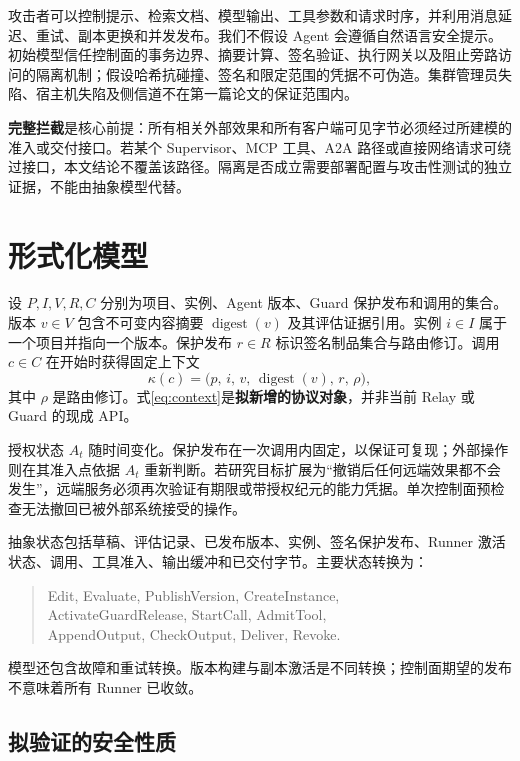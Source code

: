 \documentclass[11pt,a4paper]{article}
\theoremstyle{definition}
\begin{document}
攻击者可以控制提示、检索文档、模型输出、工具参数和请求时序，并利用消息延迟、重试、副本更换和并发发布。我们不假设 Agent 会遵循自然语言安全提示。初始模型信任控制面的事务边界、摘要计算、签名验证、执行网关以及阻止旁路访问的隔离机制；假设哈希抗碰撞、签名和限定范围的凭据不可伪造。集群管理员失陷、宿主机失陷及侧信道不在第一篇论文的保证范围内。

\textbf{完整拦截}是核心前提：所有相关外部效果和所有客户端可见字节必须经过所建模的准入或交付接口。若某个 Supervisor、MCP 工具、A2A 路径或直接网络请求可绕过接口，本文结论不覆盖该路径。隔离是否成立需要部署配置与攻击性测试的独立证据，不能由抽象模型代替。

\section{形式化模型}

设 $P,I,V,R,C$ 分别为项目、实例、Agent 版本、Guard 保护发布和调用的集合。版本 $v\in V$ 包含不可变内容摘要 $\operatorname{digest}(v)$ 及其评估证据引用。实例 $i\in I$ 属于一个项目并指向一个版本。保护发布 $r\in R$ 标识签名制品集合与路由修订。调用 $c\in C$ 在开始时获得固定上下文
\begin{equation}
\kappa(c)=\bigl(p,\,i,\,v,\,\operatorname{digest}(v),\,r,\,\rho\bigr),
\label{eq:context}
\end{equation}
其中 $\rho$ 是路由修订。式\eqref{eq:context}是\textbf{拟新增的协议对象}，并非当前 Relay 或 Guard 的现成 API。

授权状态 $A_t$ 随时间变化。保护发布在一次调用内固定，以保证可复现；外部操作则在其准入点依据 $A_t$ 重新判断。若研究目标扩展为“撤销后任何远端效果都不会发生”，远端服务必须再次验证有期限或带授权纪元的能力凭据。单次控制面预检查无法撤回已被外部系统接受的操作。

抽象状态包括草稿、评估记录、已发布版本、实例、签名保护发布、Runner 激活状态、调用、工具准入、输出缓冲和已交付字节。主要状态转换为：
\begin{quote}\small\ttfamily
Edit, Evaluate, PublishVersion, CreateInstance,\\
ActivateGuardRelease, StartCall, AdmitTool,\\
AppendOutput, CheckOutput, Deliver, Revoke.
\end{quote}
模型还包含故障和重试转换。版本构建与副本激活是不同转换；控制面期望的发布不意味着所有 Runner 已收敛。

\subsection{拟验证的安全性质}
\end{document}
